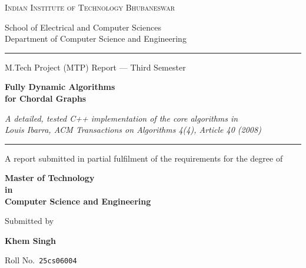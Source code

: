 \documentclass[11pt,a4paper,oneside]{report}
\theoremstyle{plain}
\theoremstyle{definition}
\theoremstyle{remark}
\begin{document}
\hypersetup{pageanchor=false}
\begin{titlepage}
\centering
{\large\scshape Indian Institute of Technology Bhubaneswar\par}
\vspace{1mm}
{\normalsize School of Electrical and Computer Sciences\\
Department of Computer Science and Engineering\par}
\vspace{8mm}
{\color{accent}\rule{\textwidth}{1.2pt}}\par
\vspace{6mm}
{\large M.Tech Project (MTP) Report --- Third Semester\par}
\vspace{7mm}
{\color{accent}\fontsize{25}{31}\selectfont\bfseries Fully Dynamic Algorithms\\[1mm]
for Chordal Graphs\par}
\vspace{5mm}
{\Large\itshape A detailed, tested C++ implementation of the core algorithms in\\ Louis Ibarra,
\emph{ACM Transactions on Algorithms} 4(4), Article 40 (2008)\par}
\vspace{6mm}
{\color{accent}\rule{\textwidth}{1.2pt}}\par
\vspace{9mm}
{\normalsize A report submitted in partial fulfilment of the requirements for the degree of\par}
\vspace{1mm}
{\large\bfseries Master of Technology\\ in\\ Computer Science and Engineering\par}
\vspace{9mm}
{\normalsize Submitted by\par}
\vspace{1mm}
{\LARGE\bfseries Khem Singh\par}
\vspace{1mm}
{\large Roll No.\ \texttt{25cs06004}\par}
\vspace{8mm}

\end{titlepage}
\end{document}
